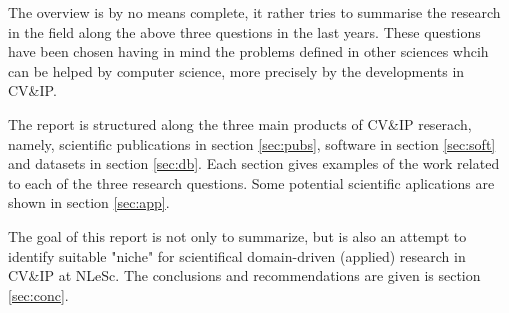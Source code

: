 The overview is by no means complete, it rather tries to summarise the research in the field along the above three questions in the last years. 
These questions have been chosen having in mind the problems defined in other sciences whcih can be helped by computer science, more precisely by the developments in CV\&IP.

The report is structured along the three main products of CV\&IP reserach, namely, scientific publications in section \ref{sec:pubs}, software in section \ref{sec:soft} and datasets in section \ref{sec:db}. Each section gives examples of the work related to each of the three research questions. Some potential scientific aplications are shown in section \ref{sec:app}.

The goal of this report is not only to summarize, but is also an attempt to identify suitable "niche" for scientifical domain-driven (applied) research in CV\&IP at NLeSc. The conclusions and recommendations are given is section \ref{sec:conc}.